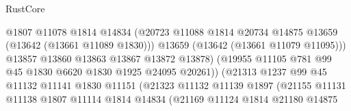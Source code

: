 \begin{lexlean}{RustCore}
\begin{coremodule}
                                          @1807
                                          @11078
                                          @1814
                                          @14834
                                          (@20723
                                            @11088
                                            @1814
                                            @20734
                                            @14875
                                            @13659
                                            (@13642 (@13661 @11089 @1830)))
                                          @13659
                                          (@13642 (@13661 @11079 @11095)))
                                        @13857
                                        @13860
                                        @13863
                                        @13867
                                        @13872
                                        @13878)
                                      (@19955
                                        @11105
                                        @781
                                        @99
                                        @45
                                        @1830
                                        @6620
                                        @1830
                                        @1925
                                        @24095
                                        @20261))
                                    (@21313
                                      @1237
                                      @99
                                      @45
                                      @11132
                                      @11141
                                      @1830
                                      @11151
                                      (@21323
                                        @11132
                                        @11139
                                        @1897
                                        (@21155
                                          @11131
                                          @11138
                                          @1807
                                          @11114
                                          @1814
                                          @14834
                                          (@21169
                                            @11124
                                            @1814
                                            @21180
                                            @14875

\end{coremodule}
\end{lexlean}
